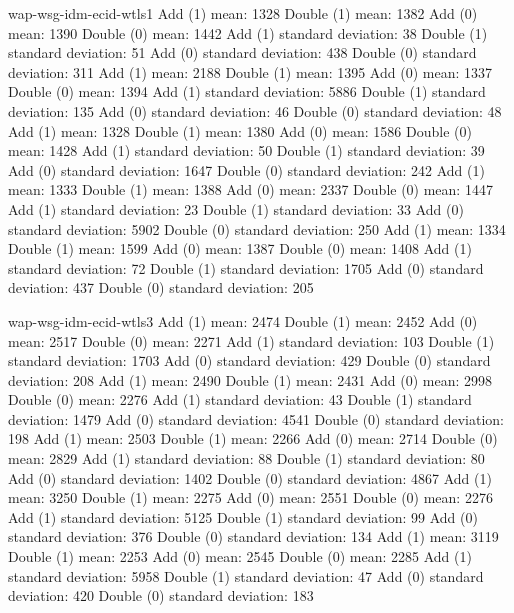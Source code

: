 \documentclass[a4paper, 8pt, envcountsect, runningheads]{article}
\begin{document}
wap-wsg-idm-ecid-wtls1
Add (1) mean: 1328
Double (1) mean: 1382
Add (0) mean: 1390
Double (0) mean: 1442
Add (1) standard deviation: 38
Double (1) standard deviation: 51
Add (0) standard deviation: 438
Double (0) standard deviation: 311
Add (1) mean: 2188
Double (1) mean: 1395
Add (0) mean: 1337
Double (0) mean: 1394
Add (1) standard deviation: 5886
Double (1) standard deviation: 135
Add (0) standard deviation: 46
Double (0) standard deviation: 48
Add (1) mean: 1328
Double (1) mean: 1380
Add (0) mean: 1586
Double (0) mean: 1428
Add (1) standard deviation: 50
Double (1) standard deviation: 39
Add (0) standard deviation: 1647
Double (0) standard deviation: 242
Add (1) mean: 1333
Double (1) mean: 1388
Add (0) mean: 2337
Double (0) mean: 1447
Add (1) standard deviation: 23
Double (1) standard deviation: 33
Add (0) standard deviation: 5902
Double (0) standard deviation: 250
Add (1) mean: 1334
Double (1) mean: 1599
Add (0) mean: 1387
Double (0) mean: 1408
Add (1) standard deviation: 72
Double (1) standard deviation: 1705
Add (0) standard deviation: 437
Double (0) standard deviation: 205

wap-wsg-idm-ecid-wtls3
Add (1) mean: 2474
Double (1) mean: 2452
Add (0) mean: 2517
Double (0) mean: 2271
Add (1) standard deviation: 103
Double (1) standard deviation: 1703
Add (0) standard deviation: 429
Double (0) standard deviation: 208
Add (1) mean: 2490
Double (1) mean: 2431
Add (0) mean: 2998
Double (0) mean: 2276
Add (1) standard deviation: 43
Double (1) standard deviation: 1479
Add (0) standard deviation: 4541
Double (0) standard deviation: 198
Add (1) mean: 2503
Double (1) mean: 2266
Add (0) mean: 2714
Double (0) mean: 2829
Add (1) standard deviation: 88
Double (1) standard deviation: 80
Add (0) standard deviation: 1402
Double (0) standard deviation: 4867
Add (1) mean: 3250
Double (1) mean: 2275
Add (0) mean: 2551
Double (0) mean: 2276
Add (1) standard deviation: 5125
Double (1) standard deviation: 99
Add (0) standard deviation: 376
Double (0) standard deviation: 134
Add (1) mean: 3119
Double (1) mean: 2253
Add (0) mean: 2545
Double (0) mean: 2285
Add (1) standard deviation: 5958
Double (1) standard deviation: 47
Add (0) standard deviation: 420
Double (0) standard deviation: 183
\end{document}
